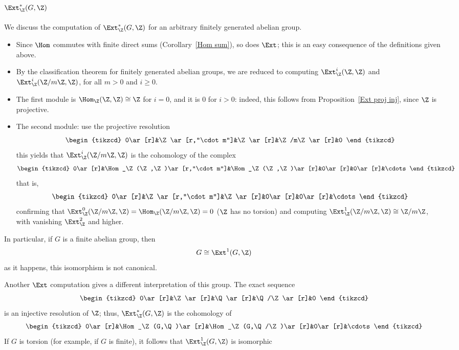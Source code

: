 \subsection{\boldmath$\Ext^*_\Z(G,\Z)$}
We discuss the computation of $\Ext^{*}_\Z(G,\Z)$ for an arbitrary finitely generated abelian group.
\begin{itemize}
\item Since $\Hom$ commutes with finite direct sums (Corollary~\ref{Hom sum}), so does $\Ext$;
this is an easy consequence of the definitions given above.
\item By the classification theorem for finitely generated abelian groups, we are reduced to computing $\Ext^i_\Z(\Z,\Z)$ and $\Ext^i_\Z(\Z/m\Z,\Z)$, for all $m>0$ and $i\geq0$.
\item The first module is $\Hom_\Z(\Z,\Z)\cong\Z$ for $i=0$, and it is $0$ for $i>0$: indeed,
this follows from Proposition~\ref{Ext proj inj}, since $\Z$ is projective.
\item The second module: use the projective resolution
\[\begin{tikzcd}
0\ar[r]&\Z\ar[r,"\cdot m"]&\Z\ar[r]&\Z/m\Z\ar[r]&0
\end{tikzcd}\]
this yields that $\Ext^i_\Z(\Z/m\Z,\Z)$ is the cohomology of the complex
\[\begin{tikzcd}
0\ar[r]&\Hom_\Z(\Z,\Z)\ar[r,"\cdot m"]&\Hom_\Z(\Z,\Z)\ar[r]&0\ar[r]&0\ar[r]&\cdots
\end{tikzcd}\]
that is,
\[\begin{tikzcd}
0\ar[r]&\Z\ar[r,"\cdot m"]&\Z\ar[r]&0\ar[r]&0\ar[r]&\cdots
\end{tikzcd}\]
confirming that $\Ext^0_\Z(\Z/m\Z,\Z)=\Hom_\Z(\Z/m\Z,\Z)=0$ ($\Z$ has no torsion) and computing 
$\Ext^1_\Z(\Z/m\Z,\Z)\cong\Z/m\Z$, with vanishing $\Ext^2_\Z$ and higher.
\end{itemize}
In particular, if $G$ is a finite abelian group, then
\[G\cong\Ext^1(G,\Z)\]
as it happens, this isomorphism is not canonical.\par
Another $\Ext$ computation gives a different interpretation of this group. The exact sequence
\[\begin{tikzcd}
0\ar[r]&\Z\ar[r]&\Q\ar[r]&\Q/\Z\ar[r]&0
\end{tikzcd}\]
is an injective resolution of $\Z$; thus, $\Ext^*_\Z(G,\Z)$ is the cohomology of
\[\begin{tikzcd}
0\ar[r]&\Hom_\Z(G,\Q)\ar[r]&\Hom_\Z(G,\Q/\Z)\ar[r]&0\ar[r]&\cdots
\end{tikzcd}\]
If $G$ is torsion (for example, if $G$ is finite), it follows that $\Ext^1_\Z(G,\Z)$ is isomorphic
